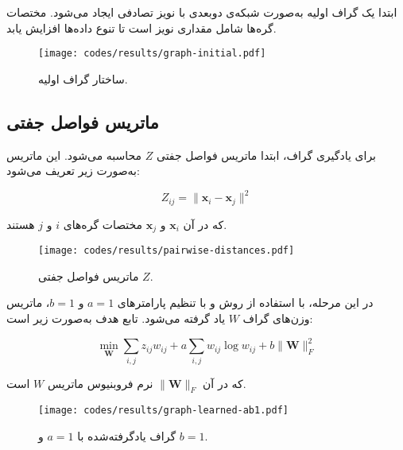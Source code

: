 \documentclass[10pt,twocolumn,a4paper]{article}
\begin{document}
	ابتدا یک گراف اولیه به‌صورت شبکه‌ی دوبعدی با نویز تصادفی ایجاد می‌شود. مختصات گره‌ها شامل مقداری نویز است تا تنوع داده‌ها افزایش یابد.
	
	\begin{latin}
		
	\end{latin}
	
	\begin{figure}[H]
		\centering
		\texttt{[image: codes/results/graph-initial.pdf]}
		\caption{ساختار گراف اولیه.}
		\label{fig:graph-initial}
	\end{figure}
	
	\subsection{ماتریس فواصل جفتی}
	برای یادگیری گراف، ابتدا ماتریس فواصل جفتی \( Z \) محاسبه می‌شود. این ماتریس به‌صورت زیر تعریف می‌شود:
	
	\[
	Z_{ij} = \|\mathbf{x}_i - \mathbf{x}_j\|^2
	\]
	
	که در آن \( \mathbf{x}_i \) و \( \mathbf{x}_j \) مختصات گره‌های \( i \) و \( j \) هستند.
	
	\begin{latin}
		
	\end{latin}
	
	
	\begin{figure}[H]
		\centering
		\texttt{[image: codes/results/pairwise-distances.pdf]}
		\caption{ماتریس فواصل جفتی \( Z \).}
		\label{fig:pairwise-distances}
	\end{figure}
	

	در این مرحله، با استفاده از روش \cite{Kalofolias2016} و با تنظیم پارامترهای \( a = 1 \) و \( b = 1 \)، ماتریس وزن‌های گراف \( W \) یاد گرفته می‌شود. تابع هدف به‌صورت زیر است:
	
	\[
	\min_{\bm{W}} \sum_{i,j} z_{ij} w_{ij} + a \sum_{i,j} {w}_{ij} \log {w}_{ij} + b \|\bm{W}\|_F^2
	\]
	
	که در آن
	\( \|\bm{W}\|_F \)
	نرم فروبنیوس ماتریس \( W \) است.
	
	\begin{latin}
		
	\end{latin}
	
	\begin{figure}[H]
		\centering
		\texttt{[image: codes/results/graph-learned-ab1.pdf]}
		\caption{گراف یادگرفته‌شده با \( a = 1 \) و \( b = 1 \).}
		\label{fig:graph-learned-ab1}
	\end{figure}
	
\end{document}

